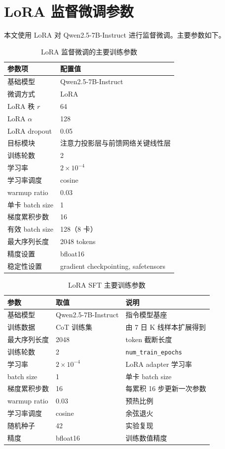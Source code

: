 \section{LoRA 监督微调参数}

本文使用 LoRA 对 Qwen2.5-7B-Instruct 进行监督微调。主要参数如下。

\begin{table}[htbp]
  \centering
  \caption{LoRA 监督微调的主要训练参数}
  \begin{tabular}{p{}p{}}
    \toprule
    参数项 & 配置值 \\
    \midrule
    基础模型 & Qwen2.5-7B-Instruct \\
    微调方式 & LoRA \\
    LoRA 秩 \(r\) & 64 \\
    LoRA \(\alpha\) & 128 \\
    LoRA dropout & 0.05 \\
    目标模块 & 注意力投影层与前馈网络关键线性层 \\
    训练轮数 & 2 \\
    学习率 & \(2\times10^{-4}\) \\
    学习率调度 & cosine \\
    warmup ratio & 0.03 \\
    单卡 batch size & 1 \\
    梯度累积步数 & 16 \\
    有效 batch size & 128（8 卡） \\
    最大序列长度 & 2048 tokens \\
    精度设置 & bfloat16 \\
    稳定性设置 & gradient checkpointing, safetensors \\
    \bottomrule
  \end{tabular}
\end{table}

\begin{table}[htbp]
  \centering
  \caption{LoRA SFT 主要训练参数}
  \begin{tabular}{@{}p{}p{}p{}@{}}
    \toprule
    参数 & 取值 & 说明 \\
    \midrule
    基础模型 & Qwen2.5-7B-Instruct & 指令模型基座 \\
    训练数据 & CoT 训练集 & 由 7 日 K 线样本扩展得到 \\
    最大序列长度 & 2048 & token 截断长度 \\
    训练轮数 & 2 & \texttt{num\_train\_epochs} \\
    学习率 & \(2\times10^{-4}\) & LoRA adapter 学习率 \\
    batch size & 1 & 单卡 batch size \\
    梯度累积步数 & 16 & 每累积 16 步更新一次参数 \\
    warmup ratio & 0.03 & 预热比例 \\
    学习率调度 & cosine & 余弦退火 \\
    随机种子 & 42 & 实验复现 \\
    精度 & bfloat16 & 训练数值精度 \\
    \bottomrule
  \end{tabular}
\end{table}

